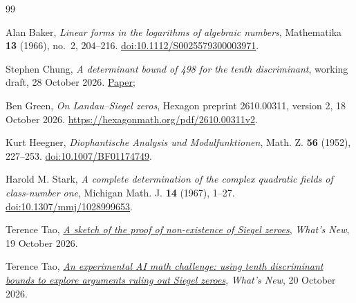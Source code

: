 \begin{thebibliography}{99}
\raggedright

Alan Baker, \emph{Linear forms in the logarithms of algebraic numbers},
Mathematika \textbf{13} (1966), no.~2, 204--216.
\href{https://doi.org/10.1112/S0025579300003971}{doi:10.1112/S0025579300003971}.

Stephen Chung, \emph{A determinant bound of 498 for the tenth discriminant},
working draft, 28 October 2026.
\href{https://github.com/dualverse-ai/tenth_discriminant/blob/main/bound-498/tenth-discriminant-498.pdf}{Paper};


Ben Green, \emph{On Landau--Siegel zeros},
Hexagon preprint 2610.00311, version 2, 18 October 2026.
\url{https://hexagonmath.org/pdf/2610.00311v2}.

Kurt Heegner, \emph{Diophantische Analysis und Modulfunktionen},
Math. Z. \textbf{56} (1952), 227--253.
\href{https://doi.org/10.1007/BF01174749}{doi:10.1007/BF01174749}.

Harold M. Stark, \emph{A complete determination of the complex quadratic fields of class-number one},
Michigan Math. J. \textbf{14} (1967), 1--27.
\href{https://doi.org/10.1307/mmj/1028999653}{doi:10.1307/mmj/1028999653}.

Terence Tao, \href{https://terrytao.wordpress.com/2026/10/19/a-sketch-of-the-proof-of-non-existence-of-siegel-zeroes/}{\emph{A sketch of the proof of non-existence of Siegel zeroes}},
\emph{What's New}, 19 October 2026.

Terence Tao, \href{https://terrytao.wordpress.com/2026/10/20/an-experimental-ai-math-challenge-using-tenth-discriminant-bounds-to-explore-arguments-ruling-out-siegel-zeroes/}{\emph{An experimental AI math challenge: using tenth discriminant bounds to explore arguments ruling out Siegel zeroes}},
\emph{What's New}, 20 October 2026.

\end{thebibliography}

